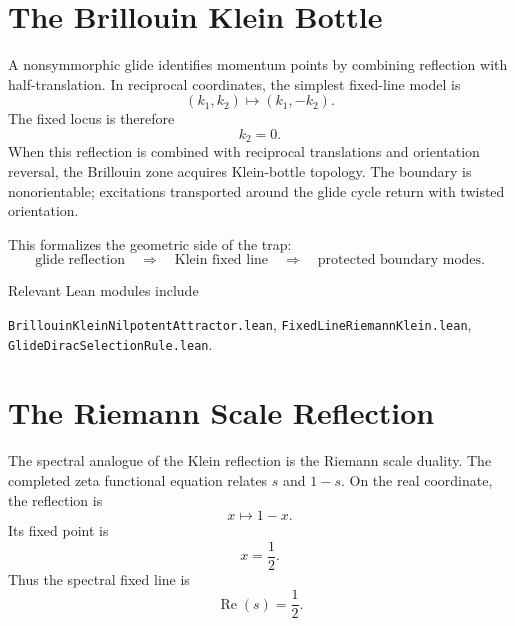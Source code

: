 \section{The Brillouin Klein Bottle}

A nonsymmorphic glide identifies momentum points by combining reflection with half-translation.  In reciprocal coordinates, the simplest fixed-line model is
\begin{equation}
    (k_1,k_2)\mapsto(k_1,-k_2).
\end{equation}
The fixed locus is therefore
\begin{equation}
    k_2=0.
\end{equation}
When this reflection is combined with reciprocal translations and orientation reversal, the Brillouin zone acquires Klein-bottle topology.  The boundary is nonorientable; excitations transported around the glide cycle return with twisted orientation.

This formalizes the geometric side of the trap:
\begin{equation}
    \text{glide reflection}
    \quad\Longrightarrow\quad
    \text{Klein fixed line}
    \quad\Longrightarrow\quad
    \text{protected boundary modes}.
\end{equation}

Relevant Lean modules include
\begin{center}
\texttt{BrillouinKleinNilpotentAttractor.lean},\quad
\texttt{FixedLineRiemannKlein.lean},\quad
\texttt{GlideDiracSelectionRule.lean}.
\end{center}

\section{The Riemann Scale Reflection}

The spectral analogue of the Klein reflection is the Riemann scale duality.  The completed zeta functional equation relates $s$ and $1-s$.  On the real coordinate, the reflection is
\begin{equation}
    x\mapsto 1-x.
\end{equation}
Its fixed point is
\begin{equation}
    x=\frac12.
\end{equation}
Thus the spectral fixed line is
\begin{equation}
    \operatorname{Re}(s)=\frac12.
\end{equation}

